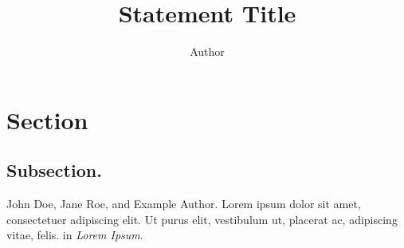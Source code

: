 \documentclass{nsf-grfp}
\title{Statement Title}
\author{Author}
\begin{document}
\maketitle

\lipsum[1-2]

\section*{Section}
\lipsum[3]

\subsection*{Subsection.}
\lipsum[4-5]

\begin{thebibliography}{9}
    John Doe, Jane Roe, and Example Author. Lorem ipsum dolor sit amet, consectetuer adipiscing elit. Ut purus elit, vestibulum ut, placerat ac, adipiscing vitae, felis. in \textit{Lorem Ipsum}.
\end{thebibliography}
\end{document}
